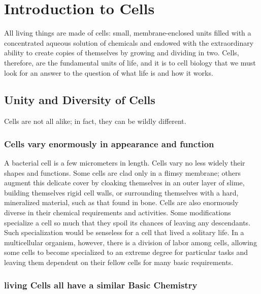 \chapter{Introduction to Cells}

All living things are made of cells: small, membrane-enclosed units
filled with a concentrated aqueous solution of chemicals and endowed
with the extraordinary ability to create copies of themselves by growing
and dividing in two.
Cells, therefore, are the fundamental units of life, and it is to cell biology
that we must look for an answer to the question of what life is and how it
works.

\section{Unity and Diversity of Cells}

Cells are not all alike; in fact, they can be wildly different.

\subsection{Cells vary enormously in appearance and function}

A bacterial cell is a few micrometers in length. Cells vary no less widely
their shapes and functions.
Some cells are clad only in a flimsy membrane; others augment this delicate
cover by cloaking themselves in an outer layer of slime, building
themselves rigid cell walls, or surrounding themselves with a hard, mineralized
material, such as that found in bone.
Cells are also enormously diverse in their chemical requirements and
activities.
Some modifications specialize a cell so much that they spoil its chances
of leaving any descendants. Such specialization would be senseless for a
cell that lived a solitary life. In a multicellular organism, however, there is
a division of labor among cells, allowing some cells to become specialized
to an extreme degree for particular tasks and leaving them dependent on
their fellow cells for many basic requirements.

\subsection{living Cells all have a similar Basic Chemistry}

